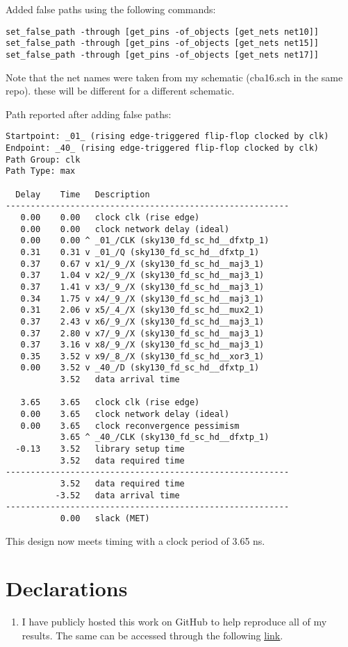 \documentclass[12pt,a4paper]{article}
\begin{document}
\noindent Added false paths using the following commands:
\begin{verbatim}
set_false_path -through [get_pins -of_objects [get_nets net10]]
set_false_path -through [get_pins -of_objects [get_nets net15]]
set_false_path -through [get_pins -of_objects [get_nets net17]]
\end{verbatim}

\noindent Note that the net names were taken from my schematic (cba16.sch in the same repo). these will be different for a different schematic.

Path reported after adding false paths:

\begin{verbatim}
Startpoint: _01_ (rising edge-triggered flip-flop clocked by clk)
Endpoint: _40_ (rising edge-triggered flip-flop clocked by clk)
Path Group: clk
Path Type: max

  Delay    Time   Description
---------------------------------------------------------
   0.00    0.00   clock clk (rise edge)
   0.00    0.00   clock network delay (ideal)
   0.00    0.00 ^ _01_/CLK (sky130_fd_sc_hd__dfxtp_1)
   0.31    0.31 v _01_/Q (sky130_fd_sc_hd__dfxtp_1)
   0.37    0.67 v x1/_9_/X (sky130_fd_sc_hd__maj3_1)
   0.37    1.04 v x2/_9_/X (sky130_fd_sc_hd__maj3_1)
   0.37    1.41 v x3/_9_/X (sky130_fd_sc_hd__maj3_1)
   0.34    1.75 v x4/_9_/X (sky130_fd_sc_hd__maj3_1)
   0.31    2.06 v x5/_4_/X (sky130_fd_sc_hd__mux2_1)
   0.37    2.43 v x6/_9_/X (sky130_fd_sc_hd__maj3_1)
   0.37    2.80 v x7/_9_/X (sky130_fd_sc_hd__maj3_1)
   0.37    3.16 v x8/_9_/X (sky130_fd_sc_hd__maj3_1)
   0.35    3.52 v x9/_8_/X (sky130_fd_sc_hd__xor3_1)
   0.00    3.52 v _40_/D (sky130_fd_sc_hd__dfxtp_1)
           3.52   data arrival time

   3.65    3.65   clock clk (rise edge)
   0.00    3.65   clock network delay (ideal)
   0.00    3.65   clock reconvergence pessimism
           3.65 ^ _40_/CLK (sky130_fd_sc_hd__dfxtp_1)
  -0.13    3.52   library setup time
           3.52   data required time
---------------------------------------------------------
           3.52   data required time
          -3.52   data arrival time
---------------------------------------------------------
           0.00   slack (MET)
\end{verbatim}

\noindent This design now meets timing with a clock period of 3.65 ns.

\section{Declarations}
\begin{enumerate}
    \item I have publicly hosted this work on GitHub to help reproduce all of my results. The same can be accessed through the following \href{https://github.com/iamkarthikbk/ee5311-2025}{\underline{link}}.
\end{enumerate}
\end{document}

